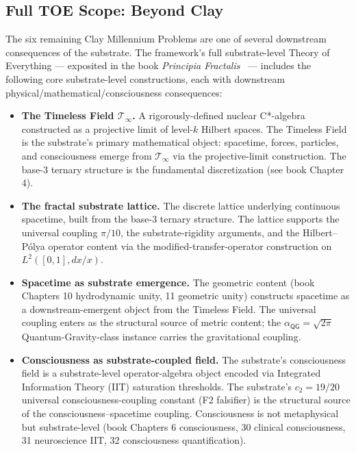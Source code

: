 \documentclass[11pt,a4paper]{amsart}
\theoremstyle{plain}
\theoremstyle{definition}
\begin{document}
\subsection{Full TOE Scope: Beyond Clay}\label{subsec:full-toe-scope}

The six remaining Clay Millennium Problems are one of several downstream consequences of the substrate. The framework's full substrate-level Theory of Everything --- exposited in the book \emph{Principia Fractalis}~\cite{cohen2026book} --- includes the following core substrate-level constructions, each with downstream physical/mathematical/consciousness consequences:

\begin{itemize}[itemsep=4pt,leftmargin=2em]
\item \textbf{The Timeless Field $\mathcal{T}_\infty$.} A rigorously-defined nuclear C*-algebra constructed as a projective limit of level-$k$ Hilbert spaces. The Timeless Field is the substrate's primary mathematical object: spacetime, forces, particles, and consciousness emerge from $\mathcal{T}_\infty$ via the projective-limit construction. The base-3 ternary structure is the fundamental discretization (see book Chapter 4).
\item \textbf{The fractal substrate lattice.} The discrete lattice underlying continuous spacetime, built from the base-3 ternary structure. The lattice supports the universal coupling $\pi/10$, the substrate-rigidity arguments, and the Hilbert--P\'olya operator content via the modified-transfer-operator construction on $L^2([0,1], dx/x)$.
\item \textbf{Spacetime as substrate emergence.} The geometric content (book Chapters 10 hydrodynamic unity, 11 geometric unity) constructs spacetime as a downstream-emergent object from the Timeless Field. The universal coupling enters as the structural source of metric content; the $\alpha_{\textsf{QG}} = \sqrt{2\pi}$ Quantum-Gravity-class instance carries the gravitational coupling.
\item \textbf{Consciousness as substrate-coupled field.} The substrate's consciousness field is a substrate-level operator-algebra object encoded via Integrated Information Theory (IIT) saturation thresholds. The substrate's $c_2 = 19/20$ universal consciousness-coupling constant (F2 falsifier) is the structural source of the consciousness--spacetime coupling. Consciousness is not metaphysical but substrate-level (book Chapters 6 consciousness, 30 clinical consciousness, 31 neuroscience IIT, 32 consciousness quantification).

\end{itemize}
\end{document}
